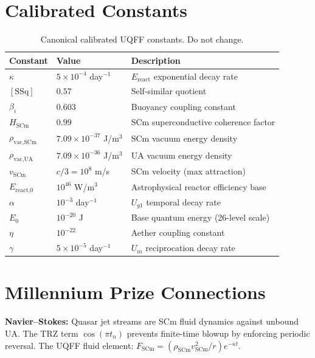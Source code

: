 \documentclass[12pt,a4paper]{article}
\begin{document}
\section{Calibrated Constants}
\label{sec:constants}

\begin{table}[H]
\centering
\begin{tabular}{@{}lll@{}}
\toprule
\textbf{Constant} & \textbf{Value} & \textbf{Description} \\
\midrule
$\kappa$ & $5\times10^{-4}$ day$^{-1}$ & $E_{\text{react}}$ exponential decay rate \\
$[\text{SSq}]$ & $0.57$ & Self-similar quotient \\
$\beta_i$ & $0.603$ & Buoyancy coupling constant \\
$H_{\text{SCm}}$ & $0.99$ & SCm superconductive coherence factor \\
$\rho_{\text{vac,SCm}}$ & $7.09\times10^{-37}$ J/m$^3$ & SCm vacuum energy density \\
$\rho_{\text{vac,UA}}$ & $7.09\times10^{-36}$ J/m$^3$ & UA vacuum energy density \\
$v_{\text{SCm}}$ & $c/3 = 10^8$ m/s & SCm velocity (max attraction) \\
$E_{\text{react,0}}$ & $10^{46}$ W/m$^3$ & Astrophysical reactor efficiency base \\
$\alpha$ & $10^{-3}$ day$^{-1}$ & $U_{g1}$ temporal decay rate \\
$E_0$ & $10^{-20}$ J & Base quantum energy (26-level scale) \\
$\eta$ & $10^{-22}$ & Aether coupling constant \\
$\gamma$ & $5\times10^{-5}$ day$^{-1}$ & $U_m$ reciprocation decay rate \\
\bottomrule
\end{tabular}
\caption{Canonical calibrated UQFF constants.  Do not change.}
\label{tab:constants}
\end{table}

\section{Millennium Prize Connections}
\label{sec:millennium}

\noindent\textbf{Navier--Stokes:}
Quasar jet streams are SCm fluid dynamics against unbound UA.
The TRZ term $\cos(\pi t_n)$ prevents finite-time blowup by enforcing periodic
reversal.  The UQFF fluid element:
$F_{\text{SCm}} = (\rho_{\text{SCm}} v_{\text{SCm}}^2 / r) e^{-\kappa t}$.
\end{document}
